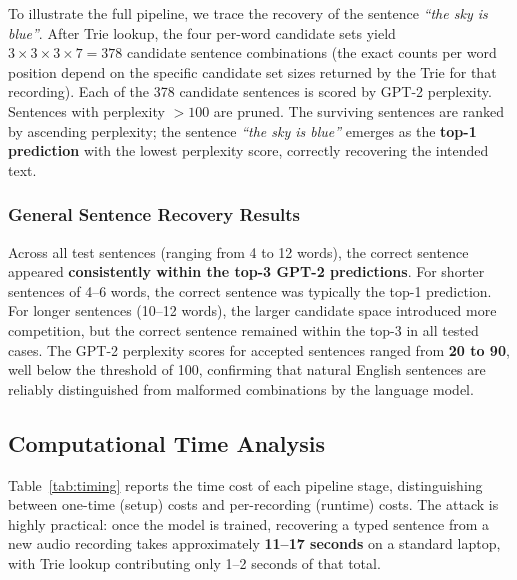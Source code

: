 \documentclass[conference]{IEEEtran}
\begin{document}
To illustrate the full pipeline, we trace the recovery of the sentence \textit{``the sky is blue''}. After Trie lookup, the four per-word candidate sets yield $3 \times 3 \times 3 \times 7 = 378$ candidate sentence combinations (the exact counts per word position depend on the specific candidate set sizes returned by the Trie for that recording). Each of the 378 candidate sentences is scored by GPT-2 perplexity. Sentences with perplexity $> 100$ are pruned. The surviving sentences are ranked by ascending perplexity; the sentence \textit{``the sky is blue''} emerges as the \textbf{top-1 prediction} with the lowest perplexity score, correctly recovering the intended text.

\subsubsection{General Sentence Recovery Results}

Across all test sentences (ranging from 4 to 12 words), the correct sentence appeared \textbf{consistently within the top-3 GPT-2 predictions}. For shorter sentences of 4--6 words, the correct sentence was typically the top-1 prediction. For longer sentences (10--12 words), the larger candidate space introduced more competition, but the correct sentence remained within the top-3 in all tested cases. The GPT-2 perplexity scores for accepted sentences ranged from \textbf{20 to 90}, well below the threshold of 100, confirming that natural English sentences are reliably distinguished from malformed combinations by the language model.

\subsection{Computational Time Analysis}

Table~\ref{tab:timing} reports the time cost of each pipeline stage, distinguishing between one-time (setup) costs and per-recording (runtime) costs. The attack is highly practical: once the model is trained, recovering a typed sentence from a new audio recording takes approximately \textbf{11--17 seconds} on a standard laptop, with Trie lookup contributing only 1--2 seconds of that total.
\end{document}
